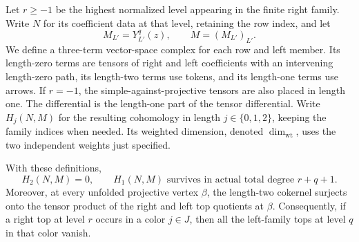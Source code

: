 Let \(r\ge-1\) be the highest normalized level appearing in the
finite right family.  Write \(N\) for its coefficient data at that
level, retaining the row index, and let
\[
 M_{L'}=Y_{L'}^q(z),\qquad M=(M_{L'})_{L'}.
\]
We define a three-term vector-space complex for each row and left
member.  Its length-zero terms are tensors of right and left
coefficients with an intervening length-zero path, its length-two
terms use tokens, and its length-one terms use arrows.  If \(r=-1\),
the simple-against-projective tensors are also placed in length one.
The differential is the length-one part of the tensor differential.
Write \(H_j(N,M)\) for the resulting cohomology in length
\(j\in\{0,1,2\}\), keeping the family indices when needed.  Its
weighted dimension, denoted \(\dim_{\mathrm{wt}}\), uses the two
independent weights just specified.

\begin{lemma}
\label{lem:two-point-tensor-filtration}
With these definitions,
\begin{equation}
\label{eq:two-point-highest-tensor}
 H_2(N,M)=0,
 \qquad
 H_1(N,M)\text{ survives in actual total degree }r+q+1.
\end{equation}
Moreover, at every unfolded projective vertex \(\beta\), the
length-two cokernel surjects onto the tensor product of the right
and left top quotients at \(\beta\).  Consequently, if a right top
at level \(r\) occurs in a color \(j\in J\), then all the
left-family tops at level \(q\) in that color vanish.
\end{lemma}

